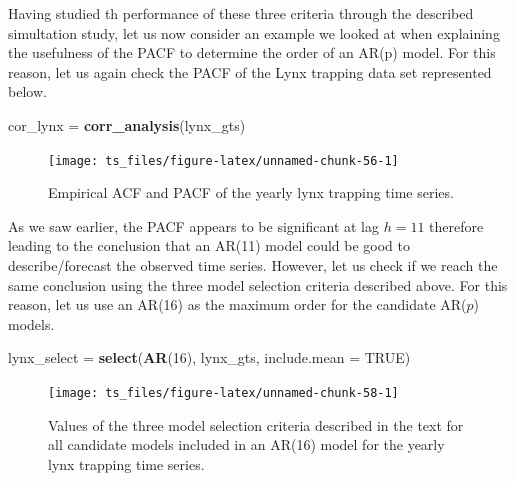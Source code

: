 \documentclass[]{book}
\newenvironment{Shaded}{\begin{snugshade}}{\end{snugshade}}
\newcommand{\KeywordTok}[1]{\textcolor[rgb]{0.13,0.29,0.53}{\textbf{#1}}}
\newcommand{\DataTypeTok}[1]{\textcolor[rgb]{0.13,0.29,0.53}{#1}}
\newcommand{\DecValTok}[1]{\textcolor[rgb]{0.00,0.00,0.81}{#1}}
\newcommand{\StringTok}[1]{\textcolor[rgb]{0.31,0.60,0.02}{#1}}
\newcommand{\OtherTok}[1]{\textcolor[rgb]{0.56,0.35,0.01}{#1}}
\newcommand{\NormalTok}[1]{#1}
\theoremstyle{definition}
\theoremstyle{definition}
\theoremstyle{definition}
\theoremstyle{remark}
\begin{document}
Having studied th performance of these three criteria through the
described simultation study, let us now consider an example we looked at
when explaining the usefulness of the PACF to determine the order of an
AR(p) model. For this reason, let us again check the PACF of the Lynx
trapping data set represented below.

\begin{Shaded}
\begin{Highlighting}[]
\NormalTok{cor_lynx =}\StringTok{ }\KeywordTok{corr_analysis}\NormalTok{(lynx_gts)}
\end{Highlighting}
\end{Shaded}

\begin{figure}

{\centering \texttt{[image: ts\_files/figure-latex/unnamed-chunk-56-1]} 

}

\caption{Empirical ACF and PACF of the yearly lynx trapping time series.}\label{fig:unnamed-chunk-56}
\end{figure}

As we saw earlier, the PACF appears to be significant at lag \(h = 11\)
therefore leading to the conclusion that an AR(11) model could be good
to describe/forecast the observed time series. However, let us check if
we reach the same conclusion using the three model selection criteria
described above. For this reason, let us use an AR(16) as the maximum
order for the candidate AR(\(p\)) models.

\begin{Shaded}
\begin{Highlighting}[]
\NormalTok{lynx_select =}\StringTok{ }\KeywordTok{select}\NormalTok{(}\KeywordTok{AR}\NormalTok{(}\DecValTok{16}\NormalTok{), lynx_gts, }\DataTypeTok{include.mean =} \OtherTok{TRUE}\NormalTok{)}
\end{Highlighting}
\end{Shaded}

\begin{figure}

{\centering \texttt{[image: ts\_files/figure-latex/unnamed-chunk-58-1]} 

}

\caption{Values of the three model selection criteria described in the text for all candidate models included in an AR(16) model for the yearly lynx trapping time series.}\label{fig:unnamed-chunk-58}
\end{figure}
\end{document}
